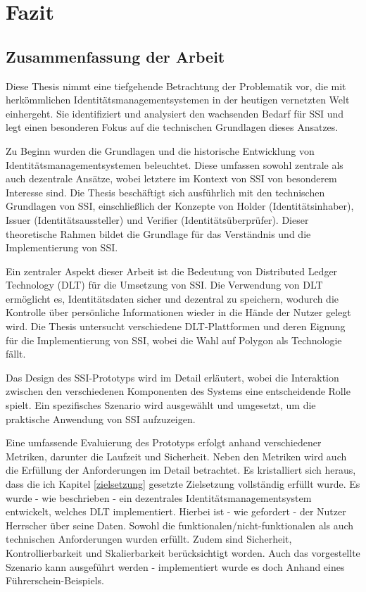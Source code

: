 \chapter{Fazit}
\label{cha:fazit}

\section{Zusammenfassung der Arbeit}
Diese Thesis nimmt eine tiefgehende Betrachtung der Problematik vor, die mit herkömmlichen Identitätsmanagementsystemen in der heutigen vernetzten Welt einhergeht. Sie identifiziert und analysiert den wachsenden Bedarf für SSI und legt einen besonderen Fokus auf die technischen Grundlagen dieses Ansatzes.

Zu Beginn wurden die Grundlagen und die historische Entwicklung von Identitätsmanagementsystemen beleuchtet. Diese umfassen sowohl zentrale als auch dezentrale Ansätze, wobei letztere im Kontext von SSI von besonderem Interesse sind. Die Thesis beschäftigt sich ausführlich mit den technischen Grundlagen von SSI, einschließlich der Konzepte von Holder (Identitätsinhaber), Issuer (Identitätsaussteller) und Verifier (Identitätsüberprüfer). Dieser theoretische Rahmen bildet die Grundlage für das Verständnis und die Implementierung von SSI.

Ein zentraler Aspekt dieser Arbeit ist die Bedeutung von Distributed Ledger Technology (DLT) für die Umsetzung von SSI. Die Verwendung von DLT ermöglicht es, Identitätsdaten sicher und dezentral zu speichern, wodurch die Kontrolle über persönliche Informationen wieder in die Hände der Nutzer gelegt wird. Die Thesis untersucht verschiedene DLT-Plattformen und deren Eignung für die Implementierung von SSI, wobei die Wahl auf Polygon als Technologie fällt.

Das Design des SSI-Prototyps wird im Detail erläutert, wobei die Interaktion zwischen den verschiedenen Komponenten des Systems eine entscheidende Rolle spielt. Ein spezifisches Szenario wird ausgewählt und umgesetzt, um die praktische Anwendung von SSI aufzuzeigen.

Eine umfassende Evaluierung des Prototyps erfolgt anhand verschiedener Metriken, darunter die Laufzeit und Sicherheit. Neben den Metriken wird auch die Erfüllung der Anforderungen im Detail betrachtet. Es kristalliert sich heraus, dass die ich Kapitel \ref{zielsetzung} gesetzte Zielsetzung vollständig erfüllt wurde. Es wurde - wie beschrieben - ein dezentrales Identitätsmanagementsystem entwickelt, welches DLT implementiert. Hierbei ist - wie gefordert - der Nutzer Herrscher über seine Daten. Sowohl die funktionalen/nicht-funktionalen als auch technischen Anforderungen wurden erfüllt. Zudem sind Sicherheit, Kontrollierbarkeit und Skalierbarkeit berücksichtigt worden. Auch das vorgestellte Szenario kann ausgeführt werden - implementiert wurde es doch Anhand eines Führerschein-Beispiels.

